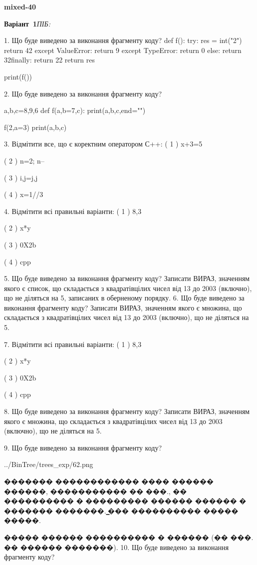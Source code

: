 \documentclass[11pt]{article}
\begin{document}
{\large\textbf{mixed-40}}

\textbf{Варіант \No\,1}\hfill \textit{ПІБ:}\,\underline{\hspace{60mm}}
\vspace{4mm}

1. Що буде виведено за виконання фрагменту коду?
def f():
    try:
        res = int("2")
return 42    except ValueError: return 9
    except TypeError: return 0
else: return 32finally: return 22    return res

print(f())

2. Що буде виведено за виконання фрагменту коду?

a,b,c=8,9,6
def f(a,b=7,c):
    print(a,b,c,end="")

f(2,a=3)
print(a,b,c)


3. Відмітити все, що є коректним оператором С++:
( 1 ) x+3=5

( 2 ) n=2; n--

( 3 ) i,j=j,j

( 4 ) x=1//3

4. Відмітити всі правильні варіанти:
( 1 ) 8,3

( 2 ) x*y

( 3 ) 0X2b

( 4 ) cpp

5. Що буде виведено за виконання фрагменту коду?
Записати ВИРАЗ, значенням якого є список, що складається з квадратівцілих чисел від 13 до 2003 (включно), що не діляться на 5, записаних в оберненому порядку.
6. Що буде виведено за виконання фрагменту коду?
Записати ВИРАЗ, значенням якого є множина, що складається з квадратівцілих чисел від 13 до 2003 (включно), що не діляться на 5.

7. Відмітити всі правильні варіанти:
( 1 ) 8,3

( 2 ) x*y

( 3 ) 0X2b

( 4 ) cpp

8. Що буде виведено за виконання фрагменту коду?
Записати ВИРАЗ, значенням якого є множина, що складається з квадратівцілих чисел від 13 до 2003 (включно), що не діляться на 5.

9. Що буде виведено за виконання фрагменту коду?

\begin{center}
	{../BinTree/trees_exp/62.png}
\end{center}
������� ������������ ���� ������ ������, ����������� �� ���., �� ���������� � ��������� ������ ������ � ������� �������. ̳��� ���������� ����� �����.\par ����� ������ ���������� � ������ (�� ���. �� ������ �������).
10. Що буде виведено за виконання фрагменту коду?
\end{document}
